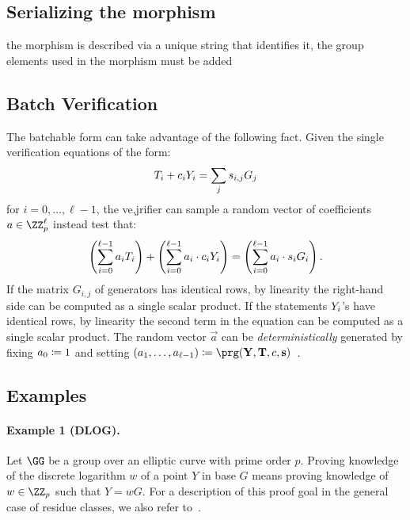 \documentclass[runningheads,11pt]{article}
\begin{document}
\subsection{Serializing the morphism}

the morphism is described via a unique string that identifies it, the group elements used in the morphism must be added
\subsection{Batch Verification}

The batchable form can take advantage of the following fact.
Given the single verification equations of the form:
\[
   T_i + c_i Y_i = \sum_j s_{i, j} G_j
\]
for $i=0, \dots,\ell-1$,
the ve,jrifier can sample a random vector of coefficients $a \in \ZZ_p^\ell$ instead test that:
\[
  \left(\sum_{i=0}^{\ell-1} a_i T_i\right) + \left(\sum_{i=0}^{\ell-1} a_i \cdot  c_i Y_i \right) = \left(\sum_{i=0}^{\ell-1} a_i \cdot s_i G_i\right).
\]
If the matrix $G_{i, j}$ of generators has identical rows, by linearity the right-hand side can be computed as a single scalar product.
If the statements $Y_i$'s have identical rows, by linearity the second term in the equation can be computed as a single scalar product.
The random vector $\vec a$ can be \emph{deterministically} generated by fixing $a_0 \coloneqq 1$ and setting $(a_1, \dots, a_{\ell-1}) \defeq \prg(\vec Y, \vec T,  \challenge, \vec s)$~\cite{bip-schnorr}.



\subsection{Examples}
\paragraph{Example 1 (DLOG).}
Let $\GG$ be a group over an elliptic curve with prime order $p$.
Proving knowledge of the discrete logarithm $w$ of a point $Y$ in base $G$ means proving knowledge of $w\in\ZZ_p$ such that $Y=wG$.
For a description of this proof goal in the general case of residue classes, we also refer to~\cite[1.4.1]{zkproof-reference}.
\end{document}
